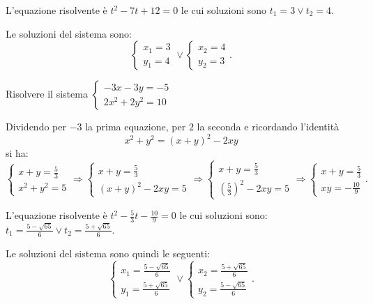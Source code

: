 \begin{exrig}
\begin{esempio}
L'equazione risolvente è $t^2-7t+12=0$ le cui soluzioni sono $t_1=3\vee t_2=4$.

Le soluzioni del sistema sono: 
\[\left\{\begin{array}{l}{x_1=3}\\
{y_1=4}\end{array}\right.\vee \left\{\begin{array}{l}{x_2=4}\\
{y_2=3}\end{array}\right..\]
\end{esempio}

\begin{esempio}
Risolvere il sistema $\left\{\begin{array}{l}{-3x-3y=-5}\\{2x^2+2y^2=10}\end{array}\right.$

Dividendo per $-3$ la prima equazione, per $2$ la seconda e ricordando l'identità 
\[x^2+y^2=(x+y)^2-2{xy}\] 
si ha: 
\[ \left\{\begin{array}{l}{x+y=\frac 5 3}\\
{x^2+y^2=5}\end{array}\right.
\Rightarrow \left\{\begin{array}{l}{x+y=\frac 5 3}\\
{(x+y)^2-2{xy}=5}\end{array}\right.
\Rightarrow \left\{\begin{array}{l}{x+y=\frac 5 3}\\
{\left(\frac 5 3\right)^2-2{xy}=5}\end{array}\right.
\Rightarrow \left\{\begin{array}{l}{x+y=\frac 5 3}\\
{{xy}=-\frac{10} 9}\end{array}\right..\]

L'equazione risolvente è $t^2-\frac 5 3t-\frac{10} 9=0$ le cui soluzioni sono: $t_1=\frac{5-\sqrt{65}} 6\vee t_2=\frac{5+\sqrt{65}} 6$.

Le soluzioni del sistema sono quindi le seguenti: 
\[\left\{\begin{array}{l}{x_1=\frac{5-\sqrt{65}} 6}\\{y_1=\frac{5+\sqrt{65}} 6}\end{array}\right.\vee \left\{\begin{array}{l}{x_2=\frac{5+\sqrt{65}} 6}\\{y_2=\frac{5-\sqrt{65}} 6}\end{array}\right..\]
\end{esempio}
\end{exrig}
\ovalbox{\risolvii \ref{ese:6.28}, \ref{ese:6.29}, \ref{ese:6.30}, \ref{ese:6.31}, \ref{ese:6.32}}

